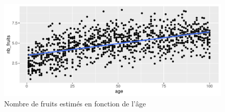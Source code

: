 \documentclass[a4paper, 10pt]{article}\usepackage[]{graphicx}\usepackage[]{xcolor}
\makeatletter
\def\maxwidth{ %
  \ifdim\Gin@nat@width>\linewidth
    \linewidth
  \else
    \Gin@nat@width
  \fi
}
\newenvironment{knitrout}{}{} %
\makeatother
\begin{document}
\begin{knitrout}
\color{fgcolor}\begin{figure}[ht!]
\includegraphics[width=\maxwidth]{Sorties/Graphunnamed-chunk-7-1} \caption[Nombre de fruits estimés en fonction de l'âge]{Nombre de fruits estimés en fonction de l'âge}\label{nbfruits_ageunnamed-chunk-7}
\end{figure}

\end{knitrout}

\newpage
\printbibliography
\end{document}
